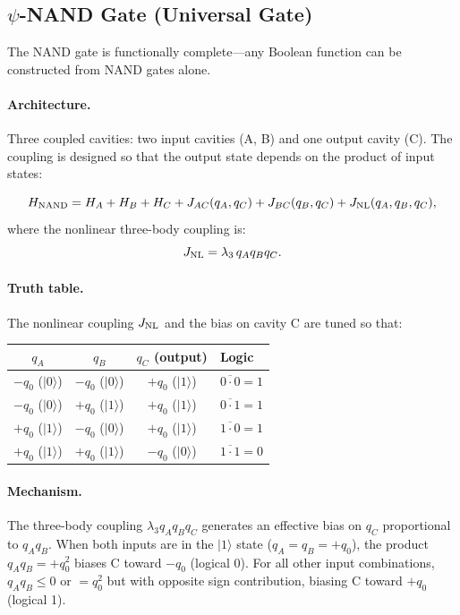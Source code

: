 \documentclass[12pt,a4paper,twoside]{article}
\begin{document}
\subsection{$\psi$-NAND Gate (Universal Gate)}\label{sec:nand_gate}

The NAND gate is functionally complete---any Boolean function can be constructed from NAND gates alone.

\paragraph{Architecture.} Three coupled cavities: two input cavities (A, B) and one output cavity (C). The coupling is designed so that the output state depends on the product of input states:

\begin{equation}
H_{\rm NAND} = H_A + H_B + H_C + J_{AC}(q_A, q_C) + J_{BC}(q_B, q_C) + J_{\rm NL}(q_A, q_B, q_C),
\label{eq:nand_ham}
\end{equation}
where the nonlinear three-body coupling is:
\begin{equation}
J_{\rm NL} = \lambda_3 \, q_A q_B q_C.
\label{eq:three_body}
\end{equation}

\paragraph{Truth table.}
The nonlinear coupling $J_{\rm NL}$ and the bias on cavity C are tuned so that:
\begin{center}
\begin{tabular}{cc|c|l}
\toprule
$q_A$ & $q_B$ & $q_C$ (output) & Logic \\
\midrule
$-q_0$ ($|0\rangle$) & $-q_0$ ($|0\rangle$) & $+q_0$ ($|1\rangle$) & $\overline{0 \cdot 0} = 1$ \\
$-q_0$ ($|0\rangle$) & $+q_0$ ($|1\rangle$) & $+q_0$ ($|1\rangle$) & $\overline{0 \cdot 1} = 1$ \\
$+q_0$ ($|1\rangle$) & $-q_0$ ($|0\rangle$) & $+q_0$ ($|1\rangle$) & $\overline{1 \cdot 0} = 1$ \\
$+q_0$ ($|1\rangle$) & $+q_0$ ($|1\rangle$) & $-q_0$ ($|0\rangle$) & $\overline{1 \cdot 1} = 0$ \\
\bottomrule
\end{tabular}
\end{center}

\paragraph{Mechanism.} The three-body coupling $\lambda_3 q_A q_B q_C$ generates an effective bias on $q_C$ proportional to $q_A q_B$. When both inputs are in the $|1\rangle$ state ($q_A = q_B = +q_0$), the product $q_A q_B = +q_0^2$ biases C toward $-q_0$ (logical 0). For all other input combinations, $q_A q_B \leq 0$ or $= q_0^2$ but with opposite sign contribution, biasing C toward $+q_0$ (logical 1).
\end{document}
